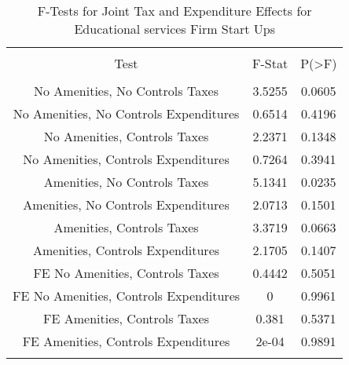 
\begin{table}[!htbp] \centering 
  \caption{F-Tests for Joint Tax and Expenditure Effects for Educational services Firm Start Ups} 
  \label{61Ftests} 
\begin{tabular}{@{\extracolsep{5pt}} ccc} 
\\[-1.8ex]\hline 
\hline \\[-1.8ex] 
Test & F-Stat & P(\textgreater F) \\ 
\hline \\[-1.8ex] 
No Amenities, No Controls Taxes & 3.5255 & 0.0605 \\ 
No Amenities, No Controls Expenditures & 0.6514 & 0.4196 \\ 
No Amenities, Controls Taxes & 2.2371 & 0.1348 \\ 
No Amenities, Controls Expenditures & 0.7264 & 0.3941 \\ 
Amenities, No Controls Taxes & 5.1341 & 0.0235 \\ 
Amenities, No Controls Expenditures & 2.0713 & 0.1501 \\ 
Amenities, Controls Taxes & 3.3719 & 0.0663 \\ 
Amenities, Controls Expenditures & 2.1705 & 0.1407 \\ 
FE No Amenities, Controls Taxes & 0.4442 & 0.5051 \\ 
FE No Amenities, Controls Expenditures & 0 & 0.9961 \\ 
FE Amenities, Controls Taxes & 0.381 & 0.5371 \\ 
FE Amenities, Controls Expenditures & 2e-04 & 0.9891 \\ 
\hline \\[-1.8ex] 
\end{tabular} 
\end{table} 
